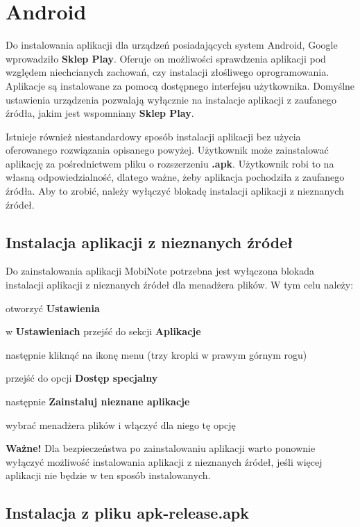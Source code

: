 \documentclass[shortabstract]{iithesis}
\begin{document}
\section{Android}

 Do instalowania aplikacji dla urządzeń posiadających system Android, Google wprowadziło \textbf{Sklep Play}. Oferuje on możliwości sprawdzenia aplikacji pod względem niechcianych zachowań, czy instalacji złośliwego oprogramowania. Aplikacje są instalowane za pomocą dostępnego interfejsu użytkownika. Domyślne ustawienia urządzenia pozwalają wyłącznie na instalacje aplikacji z zaufanego źródła, jakim jest wspomniany \textbf{Sklep Play}.

Istnieje również niestandardowy sposób instalacji aplikacji bez użycia oferowanego rozwiązania opisanego powyżej. Użytkownik może zainstalować aplikację za pośrednictwem pliku o rozszerzeniu \textbf{.apk}. Użytkownik robi to na własną odpowiedzialność, dlatego ważne, żeby aplikacja pochodziła z zaufanego źródła. Aby to zrobić, należy wyłączyć blokadę instalacji aplikacji z nieznanych źródeł.

\subsection{Instalacja aplikacji z nieznanych źródeł}
Do zainstalowania aplikacji MobiNote potrzebna jest wyłączona blokada instalacji aplikacji z nieznanych źródeł dla menadżera plików.
W tym celu należy:
\begin{compactitem}
    \item otworzyć \textbf{Ustawienia}
    \item w \textbf{Ustawieniach} przejść do sekcji \textbf{Aplikacje}
    \item następnie kliknąć na ikonę menu (trzy kropki w prawym górnym rogu)
    \item przejść do opcji \textbf{Dostęp specjalny}
    \item następnie \textbf{Zainstaluj nieznane aplikacje}
    \item wybrać menadżera plików i włączyć dla niego tę opcję
\end{compactitem}

\textbf{Ważne!} Dla bezpieczeństwa po zainstalowaniu aplikacji warto ponownie wyłączyć możliwość instalowania aplikacji z nieznanych źródeł, jeśli więcej aplikacji nie będzie w ten sposób instalowanych.

\subsection{Instalacja z pliku apk-release.apk}
\end{document}

